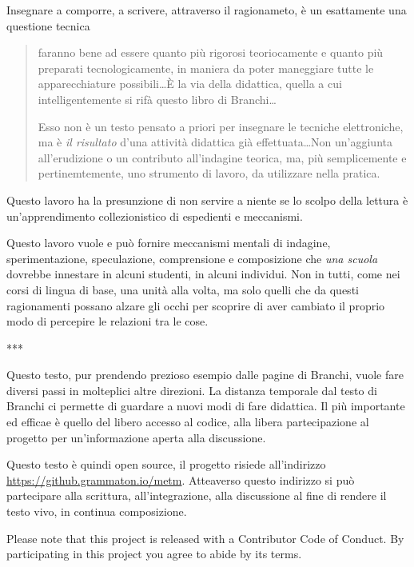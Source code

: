 Insegnare a comporre, a scrivere, attraverso il ragionameto, è un esattamente
una questione tecnica

\begin{quote}
  faranno bene ad essere quanto più rigorosi teoriocamente e quanto più
  preparati tecnologicamente, in maniera da poter maneggiare tutte le
  apparecchiature possibili\ldots È la via della didattica, quella a cui
  intelligentemente si rifà questo libro di Branchi\ldots

  Esso non è un testo pensato a priori per insegnare le tecniche elettroniche,
  ma è \emph{il risultato} d'una attività didattica già effettuata\ldots Non
  un'aggiunta all'erudizione o un contributo all'indagine teorica, ma, più
  semplicemente e pertinemtemente, uno strumento di lavoro, da utilizzare nella
  pratica.
\end{quote}

Questo lavoro ha la presunzione di non servire a niente se lo scolpo della
lettura è un'apprendimento collezionistico di espedienti e meccanismi.

Questo lavoro vuole e può fornire meccanismi mentali di indagine,
sperimentazione, speculazione, comprensione e composizione che \emph{una scuola}
dovrebbe innestare in alcuni studenti, in alcuni individui. Non in tutti, come nei
corsi di lingua di base, una unità alla volta, ma solo quelli che da questi
ragionamenti possano alzare gli occhi per scoprire di aver
cambiato il proprio modo di percepire le relazioni tra le cose.

***

Questo testo, pur prendendo prezioso esempio dalle pagine di Branchi, vuole fare
diversi passi in molteplici altre direzioni. La distanza temporale dal testo di
Branchi ci permette di guardare a nuovi modi di fare didattica. Il più
importante ed efficae è quello del libero accesso al codice, alla libera
partecipazione al progetto per un'informazione aperta alla discussione.

Questo testo è quindi open source, il progetto risiede all'indirizzo
\url{https://github.grammaton.io/metm}. Atteaverso questo indirizzo si può
partecipare alla scrittura, all'integrazione, alla discussione al fine di
rendere il testo vivo, in continua composizione.

Please note that this project is released with a Contributor Code of Conduct.
By participating in this project you agree to abide by its terms.


\clearpage
